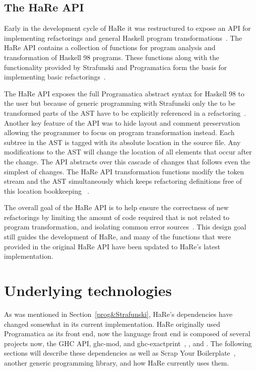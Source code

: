 \subsection{The HaRe API}\label{hareApi}

Early in the development cycle of HaRe it was restructured to expose an API for implementing refactorings and general Haskell program transformations~\citep{hareApi}. The HaRe API contains a collection of functions for program analysis and transformation of Haskell 98 programs. These functions along with the functionality provided by Strafunski and Programatica form the basis for implementing basic refactorings~\citep{hareApi}.

The HaRe API exposes the full Programatica abstract syntax for Haskell 98 to the user but because of generic programming with Strafunski only the to be transformed parts of the AST have to be explicitly referenced in a refactoring~\citep{hareApi}. Another key feature of the API was to hide layout and comment preservation allowing the programmer to focus on program transformation instead. Each subtree in the AST is tagged with its absolute location in the source file. Any modifications to the AST will change the location of all elements that occur after the change. The API abstracts over this cascade of changes that follows even the simplest of changes. The HaRe API transformation functions modify the token stream and the AST simultaneously which keeps refactoring definitions free of this location bookkeeping ~\citep{hareApi}. 

The overall goal of the HaRe API is to help ensure the correctness of new refactorings by limiting the amount of code required that is not related to program transformation, and isolating common error sources~\citep{hareApi}. This design goal still guides the development of HaRe, and many of the functions that were provided in the original HaRe API have been updated to HaRe's latest implementation. 
 
\section{Underlying technologies}

As was mentioned in Section~\ref{prog&Strafunski}, HaRe's dependencies have changed somewhat in its current implementation. HaRe originally used Programatica as its front end, now the language front end is composed of several projects now, the GHC API, ghc-mod, and ghc-exactprint~\citep{ghcApi}, \citep{ghcMod}, and \citep{exactprint}. The following sections will describe these dependencies as well as Scrap Your Boilerplate~\citep{syb}, another generic programming library, and how HaRe currently uses them.

